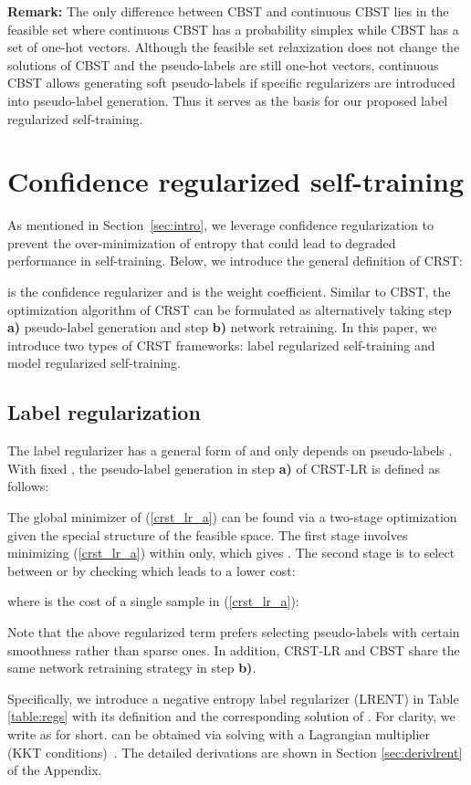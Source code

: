\documentclass[10pt,twocolumn,letterpaper]{article}
\theoremstyle{plain}
\begin{document}
\noindent\textbf{Remark:} The only difference between CBST and continuous CBST lies in the feasible set where continuous CBST has a probability simplex while CBST has a set of one-hot vectors. Although the feasible set relaxization does not change the solutions of CBST and the pseudo-labels are still one-hot vectors, continuous CBST allows generating soft pseudo-labels if specific regularizers are introduced into pseudo-label generation. Thus it serves as the basis for our proposed label regularized self-training.
\section{Confidence regularized self-training}\label{sec:crst}
As mentioned in Section~\ref{sec:intro}, we leverage confidence regularization to prevent the over-minimization of entropy that could lead to degraded performance in self-training. Below, we introduce the general definition of CRST:

 is the confidence regularizer and  is the weight coefficient. Similar to CBST, the optimization algorithm of CRST can be formulated as alternatively taking step \textbf{a)} pseudo-label generation and step \textbf{b)} network retraining. In this paper, we introduce two types of CRST frameworks: label regularized self-training and model regularized self-training.

\subsection{Label regularization}\label{subsec:lr}
The label regularizer has a general form of   and only depends on pseudo-labels . With fixed , the pseudo-label generation in step \textbf{a)} of CRST-LR is defined as follows:


The global minimizer of (\ref{crst_lr_a}) can be found via a two-stage optimization given the special structure of the feasible space. The first stage involves minimizing (\ref{crst_lr_a}) within  only, which gives . The second stage is to select between  or  by checking which leads to a lower cost:

where  is the cost of a single sample  in (\ref{crst_lr_a}):

Note that the above regularized term prefers selecting pseudo-labels with certain smoothness rather than sparse ones. In addition, CRST-LR and CBST share the same network retraining strategy in step \textbf{b)}.

Specifically, we introduce a negative entropy label regularizer (LRENT) in Table \ref{table:regs} with its definition and the corresponding solution of . For clarity, we write  as  for short.  can be obtained via solving with a Lagrangian multiplier (KKT conditions)~\cite{boyd2004convex}. The detailed derivations are shown in Section \ref{sec:derivlrent} of the Appendix.
\end{document}
